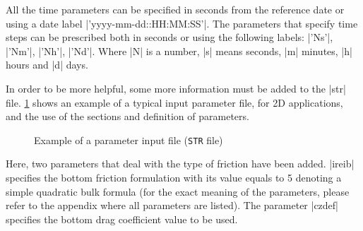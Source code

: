 All the time parameters can be specified in seconds from the reference
date or using a date label |'yyyy-mm-dd::HH:MM:SS'|. The parameters that specify
time steps can be prescribed both in seconds or using the following labels:
|'Ns'|, |'Nm'|, |'Nh'|, |'Nd'|.
Where |N| is a number, |s| means seconds, |m| minutes, |h| hours and |d| days.

In order to be more helpful, some more information must be added to the
|str| file.
\Fig\ref{fig:example} shows an example of a typical input
parameter file, for 2D applications, and the use of the sections and definition of
parameters.

\begin{figure}[htbp]
\begin{alltt}

\end{alltt}
\caption{Example of a parameter input file ({\tt STR} file)}
\label{fig:example}
\end{figure}

Here, two parameters that deal with the type of friction have been added.
|ireib| specifies the bottom friction formulation with its value equals to
5 denoting a simple quadratic bulk formula (for the exact meaning of the
parameters, please refer to the appendix where all parameters
are listed). The parameter |czdef| specifies the bottom drag coefficient value to be used.

